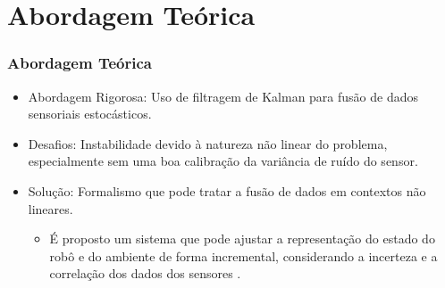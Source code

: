 \documentclass[xcolor=dvipsnames, aspectratio=169]{beamer}
\begin{document}
\section{Abordagem Teórica}
\begin{frame}
  \frametitle{Abordagem Teórica}
  \begin{itemize}
      \item Abordagem Rigorosa: Uso de filtragem de Kalman para fusão de dados sensoriais estocásticos.
      \item Desafios: Instabilidade devido à natureza não linear do problema, especialmente sem uma boa calibração da variância de ruído do sensor.
      \item Solução: Formalismo que pode tratar a fusão de dados em contextos não lineares. 
      \begin{itemize}
        \item É proposto um sistema que pode ajustar a representação do estado do robô e do ambiente de forma incremental, considerando a incerteza e a correlação dos dados dos sensores \cite{moutarlier2006experimental}.
      \end{itemize}
  \end{itemize}
\end{frame}
  
\end{document}
